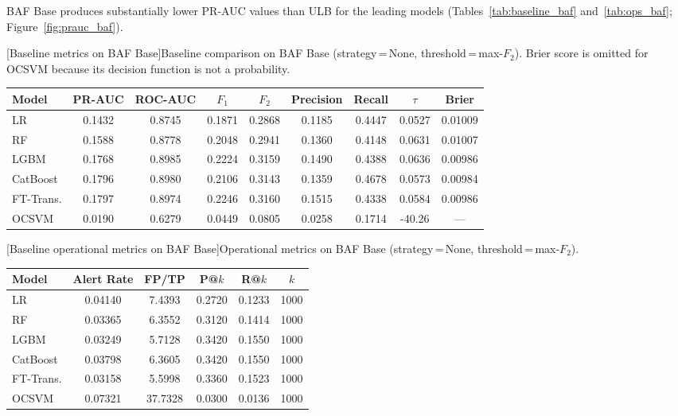 BAF Base produces substantially lower PR-AUC values than ULB for the leading models (Tables~\ref{tab:baseline_baf} and~\ref{tab:ops_baf}; Figure~\ref{fig:prauc_baf}).

\noindent\begin{minipage}{\linewidth}\centering
{}[Baseline metrics on BAF Base]{Baseline comparison on BAF Base (strategy\,=\,None, threshold\,=\,max-$F_2$). Brier score is omitted for OCSVM because its decision function is not a probability.}
\label{tab:baseline_baf}
\begin{tabular}{l c c c c c c c c}
\toprule
Model & PR-AUC & ROC-AUC & $F_1$ & $F_2$ & Precision & Recall & $\tau$ & Brier \\
\midrule
LR         & 0.1432 & 0.8745 & 0.1871 & 0.2868 & 0.1185 & 0.4447 & 0.0527 & 0.01009 \\
RF         & 0.1588 & 0.8778 & 0.2048 & 0.2941 & 0.1360 & 0.4148 & 0.0631 & 0.01007 \\
LGBM       & 0.1768 & 0.8985 & 0.2224 & 0.3159 & 0.1490 & 0.4388 & 0.0636 & 0.00986 \\
CatBoost   & 0.1796 & 0.8980 & 0.2106 & 0.3143 & 0.1359 & 0.4678 & 0.0573 & 0.00984 \\
FT-Trans.  & 0.1797 & 0.8974 & 0.2246 & 0.3160 & 0.1515 & 0.4338 & 0.0584 & 0.00986 \\
OCSVM      & 0.0190 & 0.6279 & 0.0449 & 0.0805 & 0.0258 & 0.1714 & -40.26 & --- \\
\bottomrule
\end{tabular}
\end{minipage}

\noindent\begin{minipage}{\linewidth}\centering
{}[Baseline operational metrics on BAF Base]{Operational metrics on BAF Base (strategy\,=\,None, threshold\,=\,max-$F_2$).}
\label{tab:ops_baf}
\begin{tabular}{l c c c c c}
\toprule
Model & Alert Rate & FP/TP & P@$k$ & R@$k$ & $k$ \\
\midrule
LR         & 0.04140 & 7.4393 & 0.2720 & 0.1233 & 1000 \\
RF         & 0.03365 & 6.3552 & 0.3120 & 0.1414 & 1000 \\
LGBM       & 0.03249 & 5.7128 & 0.3420 & 0.1550 & 1000 \\
CatBoost   & 0.03798 & 6.3605 & 0.3420 & 0.1550 & 1000 \\
FT-Trans.  & 0.03158 & 5.5998 & 0.3360 & 0.1523 & 1000 \\
OCSVM      & 0.07321 & 37.7328 & 0.0300 & 0.0136 & 1000 \\
\bottomrule
\end{tabular}
\end{minipage}

